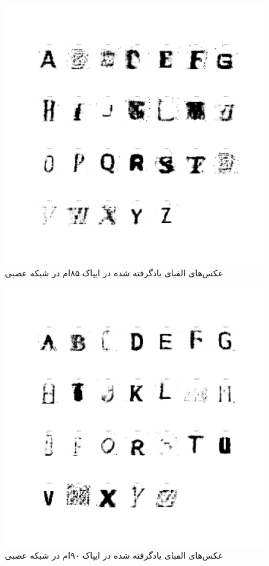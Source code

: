 \documentclass{article}
\begin{document}
\begin{figure}[H]
	\centerline{\includegraphics[width=\textwidth , height=\textheight ]{../results/CGAN_Adam/figs/Alphabet_(Epoch=85)}}
	\caption{عکس‌های الفبای یادگرفته شده در ایپاک ۸۵ام در شبکه عصبی}
\end{figure}
\begin{figure}[H]
	\centerline{\includegraphics[width=\textwidth , height=\textheight ]{../results/CGAN_Adam/figs/Alphabet_(Epoch=90)}}
	\caption{عکس‌های الفبای یادگرفته شده در ایپاک ۹۰ام در شبکه عصبی}
\end{figure}
\end{document}

